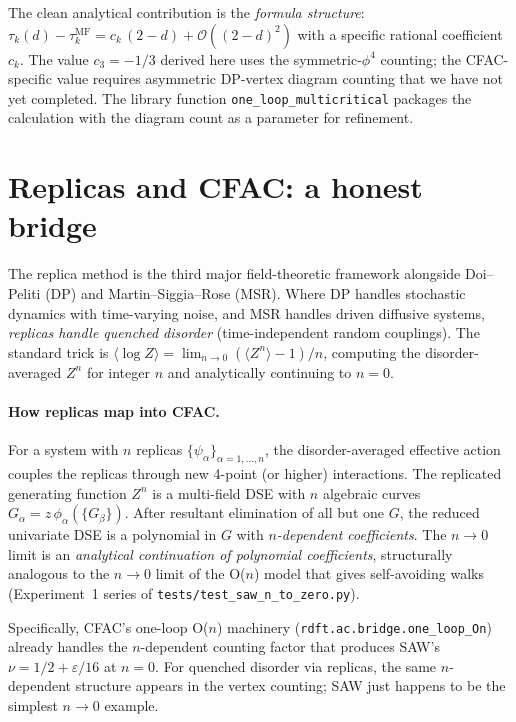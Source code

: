 \documentclass[11pt,a4paper]{article}
\theoremstyle{plain}
\begin{document}
The clean analytical contribution is the \emph{formula structure}:
$\tau_{k}(d) - \tau_{k}^{\mathrm{MF}} = c_{k}\,(2 - d) +
\mathcal{O}((2-d)^{2})$ with a specific rational coefficient $c_{k}$.
The value $c_{3} = -1/3$ derived here uses the symmetric-$\phi^{4}$
counting; the CFAC-specific value requires asymmetric DP-vertex diagram
counting that we have not yet completed.  The library function
\texttt{one\_loop\_multicritical} packages the calculation with the
diagram count as a parameter for refinement.

\section{Replicas and CFAC: a honest bridge}
\label{sec:replicas}

The replica method is the third major field-theoretic framework
alongside Doi--Peliti (DP) and Martin--Siggia--Rose (MSR).  Where DP
handles stochastic dynamics with time-varying noise, and MSR handles
driven diffusive systems, \emph{replicas handle quenched disorder}
(time-independent random couplings).  The standard trick is
$\langle \log Z \rangle = \lim_{n\to 0} (\langle Z^{n} \rangle - 1)/n$,
computing the disorder-averaged $Z^{n}$ for integer $n$ and
analytically continuing to $n = 0$.

\paragraph{How replicas map into CFAC.}
For a system with $n$ replicas $\{\psi_{\alpha}\}_{\alpha=1,\ldots,n}$,
the disorder-averaged effective action couples the replicas through
new 4-point (or higher) interactions.  The replicated generating
function $Z^{n}$ is a multi-field DSE with $n$ algebraic curves
$G_{\alpha} = z\,\phi_{\alpha}(\{G_{\beta}\})$.  After resultant
elimination of all but one $G$, the reduced univariate DSE is a
polynomial in $G$ with \emph{$n$-dependent coefficients}.  The $n\to 0$
limit is an \emph{analytical continuation of polynomial coefficients},
structurally analogous to the $n\to 0$ limit of the O($n$) model that
gives self-avoiding walks (Experiment~1 series of
\texttt{tests/test\_saw\_n\_to\_zero.py}).

Specifically, CFAC's one-loop O($n$) machinery
(\texttt{rdft.ac.bridge.one\_loop\_On}) already handles the $n$-dependent
counting factor that produces SAW's $\nu = 1/2 + \varepsilon/16$ at $n=0$.
For quenched disorder via replicas, the same $n$-dependent structure
appears in the vertex counting; SAW just happens to be the simplest
$n\to 0$ example.
\end{document}
